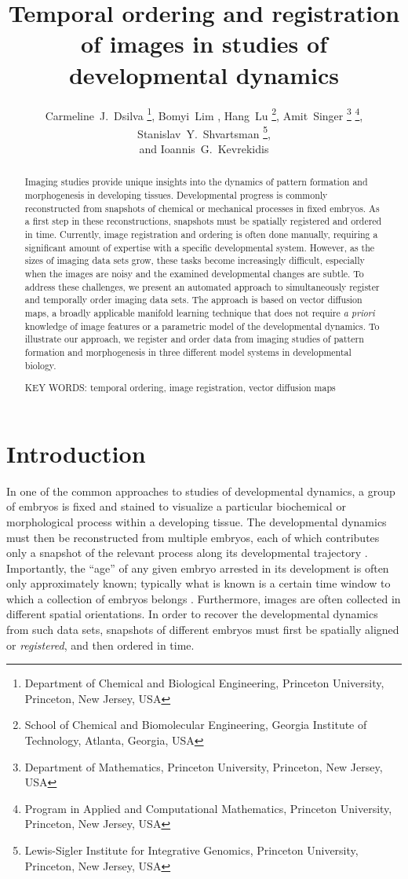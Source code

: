 \documentclass[twocolumn, 10pt]{article}
\title{Temporal ordering and registration of images in studies of developmental dynamics}
\author{Carmeline~J.~Dsilva \thanks{Department of Chemical and Biological Engineering, Princeton University, Princeton, New Jersey, USA},
Bomyi~Lim \footnotemark[1],
Hang~Lu \thanks{School of Chemical and Biomolecular Engineering, Georgia Institute of Technology, Atlanta, Georgia, USA},
Amit~Singer \thanks{Department of Mathematics, Princeton University, Princeton, New Jersey, USA} \thanks{Program in Applied and Computational Mathematics, Princeton University, Princeton, New Jersey, USA},
Stanislav~Y.~Shvartsman \footnotemark[1] \thanks{Lewis-Sigler Institute for Integrative Genomics, Princeton University, Princeton, New Jersey, USA}, \\
and Ioannis~G.~Kevrekidis \footnotemark[1] \footnotemark[4]}
\date{}
\begin{document}
\maketitle

\begin{abstract}

Imaging studies provide unique insights into the dynamics of pattern formation and morphogenesis in developing tissues.
%
Developmental progress is commonly reconstructed from snapshots of chemical or mechanical processes in fixed embryos.
%
As a first step in these reconstructions, snapshots must be spatially registered and ordered in time.
%
Currently, image registration and ordering is often done manually, requiring a significant amount of expertise with a specific developmental system.
%
However, as the sizes of imaging data sets grow, these tasks become increasingly difficult, especially when the images are noisy and the examined developmental changes are subtle.
%
To address these challenges, we present an automated approach to simultaneously register and temporally order imaging data sets.
%
The approach is based on vector diffusion maps, a broadly applicable manifold learning technique that does not require \textit{a priori} knowledge of image features or a parametric model of the developmental dynamics.
%
To illustrate our approach, we register and order data from imaging studies of pattern formation and morphogenesis in three different model systems in developmental biology.

\vspace{1em}

\noindent
KEY WORDS: temporal ordering, image registration, vector diffusion maps

\end{abstract}



\section*{Introduction}

In one of the common approaches to studies of developmental dynamics, a group of embryos is fixed and stained to visualize a particular biochemical or morphological process within a developing tissue. 
%
The developmental dynamics must then be reconstructed from multiple embryos, each of which contributes only a snapshot of the relevant process along its developmental trajectory \citep{jaeger2004dynamic, peter2011gene, fowlkes2008quantitative}.
%
Importantly, the ``age'' of any given embryo arrested in its development is often only approximately known; typically what is known is
a certain time window to which a collection of embryos belongs \citep{ng2012large, richardson2014emage, castro2009automatic}.
%
Furthermore, images are often collected in different spatial orientations.
%
In order to recover the developmental dynamics from such data sets, snapshots of different embryos must first be spatially aligned or {\em registered}, and then ordered in time.
%
\end{document}
